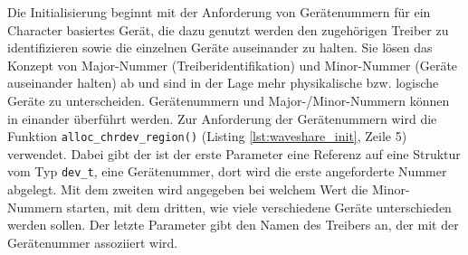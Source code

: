 Die Initialisierung beginnt mit der Anforderung von Gerätenummern für ein Character basiertes Gerät, die dazu genutzt werden den zugehörigen Treiber zu identifizieren sowie die einzelnen Geräte auseinander zu halten. Sie lösen das Konzept von Major-Nummer (Treiberidentifikation) und Minor-Nummer (Geräte auseinander halten) ab und sind in der Lage mehr physikalische bzw. logische Geräte zu unterscheiden. Gerätenummern und Major-/Minor-Nummern können in einander überführt werden. Zur Anforderung der Gerätenummern wird die Funktion \texttt{alloc_chrdev_region()} (Listing \ref{lst:waveshare_init}, Zeile 5) verwendet. Dabei gibt der ist der erste Parameter eine Referenz auf eine Struktur vom Typ \texttt{dev\_t}, eine Gerätenummer, dort wird die erste angeforderte Nummer abgelegt. Mit dem zweiten wird angegeben bei welchem Wert die Minor-Nummern starten, mit dem dritten, wie viele verschiedene Geräte unterschieden werden sollen. Der letzte Parameter gibt den Namen des Treibers an, der mit der Gerätenummer assoziiert wird. 



